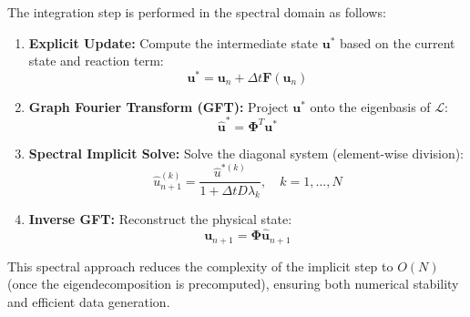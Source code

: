The integration step is performed in the spectral domain as follows:
\begin{enumerate}
    \item \textbf{Explicit Update:} Compute the intermediate state $\mathbf{u}^*$ based on the current state and reaction term:
    \begin{equation}
        \mathbf{u}^* = \mathbf{u}_n + \Delta t \mathbf{F}(\mathbf{u}_n)
    \end{equation}
    \item \textbf{Graph Fourier Transform (GFT):} Project $\mathbf{u}^*$ onto the eigenbasis of $\mathcal{L}$:
    \begin{equation}
        \hat{\mathbf{u}}^* = \mathbf{\Phi}^T \mathbf{u}^*
    \end{equation}
    \item \textbf{Spectral Implicit Solve:} Solve the diagonal system (element-wise division):
    \begin{equation}
        \hat{u}_{n+1}^{(k)} = \frac{\hat{u}^{*(k)}}{1 + \Delta t D \lambda_k}, \quad k=1,\dots,N
    \end{equation}
    \item \textbf{Inverse GFT:} Reconstruct the physical state:
    \begin{equation}
        \mathbf{u}_{n+1} = \mathbf{\Phi} \hat{\mathbf{u}}_{n+1}
    \end{equation}
\end{enumerate}
This spectral approach reduces the complexity of the implicit step to $O(N)$ (once the eigendecomposition is precomputed), ensuring both numerical stability and efficient data generation.


